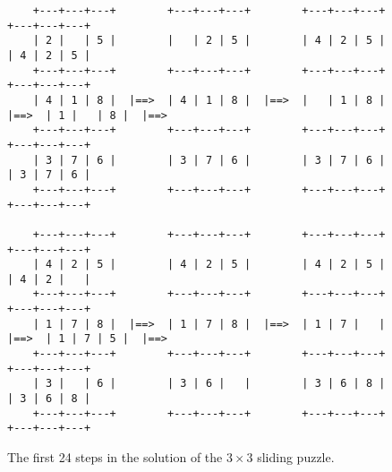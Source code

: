 \begin{figure}[!ht]
\begin{Verbatim}
    +---+---+---+        +---+---+---+        +---+---+---+        +---+---+---+        
    | 2 |   | 5 |        |   | 2 | 5 |        | 4 | 2 | 5 |        | 4 | 2 | 5 |
    +---+---+---+        +---+---+---+        +---+---+---+        +---+---+---+
    | 4 | 1 | 8 |  |==>  | 4 | 1 | 8 |  |==>  |   | 1 | 8 |  |==>  | 1 |   | 8 |  |==>
    +---+---+---+        +---+---+---+        +---+---+---+        +---+---+---+
    | 3 | 7 | 6 |        | 3 | 7 | 6 |        | 3 | 7 | 6 |        | 3 | 7 | 6 |
    +---+---+---+        +---+---+---+        +---+---+---+        +---+---+---+

    +---+---+---+        +---+---+---+        +---+---+---+        +---+---+---+        
    | 4 | 2 | 5 |        | 4 | 2 | 5 |        | 4 | 2 | 5 |        | 4 | 2 |   |
    +---+---+---+        +---+---+---+        +---+---+---+        +---+---+---+
    | 1 | 7 | 8 |  |==>  | 1 | 7 | 8 |  |==>  | 1 | 7 |   |  |==>  | 1 | 7 | 5 |  |==>
    +---+---+---+        +---+---+---+        +---+---+---+        +---+---+---+
    | 3 |   | 6 |        | 3 | 6 |   |        | 3 | 6 | 8 |        | 3 | 6 | 8 |
    +---+---+---+        +---+---+---+        +---+---+---+        +---+---+---+
\end{Verbatim}
\vspace*{-0.3cm}
\caption{The first 24 steps in the solution of the $3 \times 3$ sliding puzzle.}
\label{fig:8-puzzle.solution1}
\end{figure}

